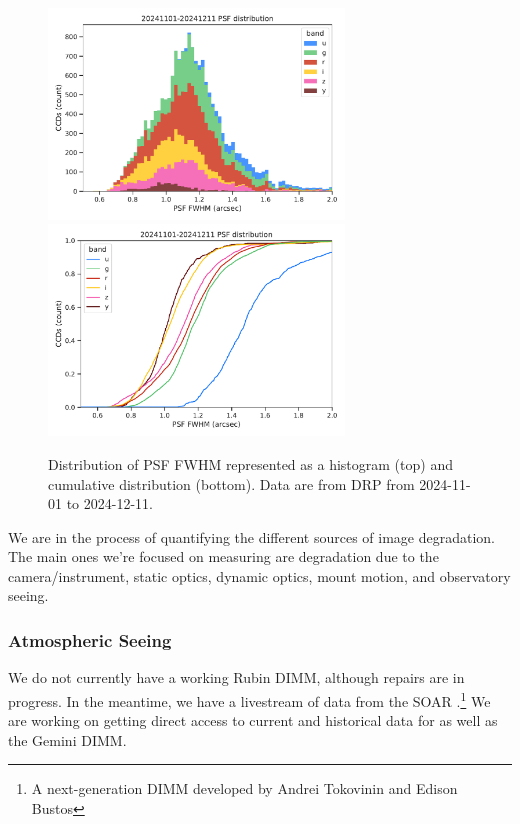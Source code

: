 \begin{figure}
  \centering
  \includegraphics[width=0.7\textwidth]{image_quality_figures/comcam_science_psf_fwhm_hist.pdf}
  \includegraphics[width=0.7\textwidth]{image_quality_figures/comcam_science_psf_fwhm_cdf.pdf}
  \caption{Distribution of PSF FWHM represented as a histogram (top) and cumulative distribution (bottom).
  Data are from DRP from 2024-11-01 to 2024-12-11.}
  \label{fig:psf_fwhm_distribution}
\end{figure}

We are in the process of quantifying the different sources of image degradation. The main ones we're focused on measuring are degradation due to the camera/instrument, static optics, dynamic optics, mount motion, and observatory seeing.

\subsubsection{Atmospheric Seeing}

We do not currently have a working Rubin DIMM, although repairs are in progress. In the meantime, we have a livestream of data from the SOAR \RINGSS.\footnote{A  next-generation DIMM developed by Andrei Tokovinin and Edison Bustos} We are working on getting direct access to current and historical data for \RINGSS as well as the Gemini DIMM.

